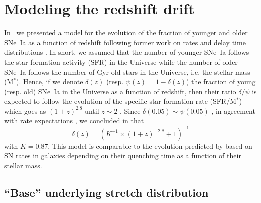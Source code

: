 \documentclass[]{aa} %
\begin{document}
\section{Modeling the redshift drift}\label{sec:modeling}

In~\cite{rigault2018} we presented a model for the evolution of the fraction of
younger and older SNe~Ia as a function of redshift following former work on
rates and delay time distributions \citep[e.g.,][]{mannucci2005,
scannapieco2005, sullivan2006, aubourg2008, childress2014, maozmannucci2014}.
In short, we assumed that the number of younger SNe~Ia follows the star
formation activity (SFR) in the Universe while the number of older SNe~Ia
follows the number of Gyr-old stars in the Universe, i.e. the stellar mass
(M$^*$). Hence, if we denote $\delta(z)$ (resp. $\psi(z) = 1-\delta(z)$) the
fraction of young (resp. old) SNe~Ia in the Universe as a function of redshift,
then their ratio $\delta/\psi$ is expected to follow the evolution of the
specific star formation rate (SFR/M$^*$) which goes as $(1+z)^{2.8}$ until
$z\sim2$ \citep[e.g.,][]{tasca2015}. Since $\delta(0.05) \sim \psi(0.05)$
\citep{rigault2013,rigault2018,wiseman2020}, in agreement with rate expectations
\citep{mannucci2006,rodney2014}, we concluded in \cite{rigault2018} that
\begin{equation}
    \label{eq:delta}
    \delta(z) = \left( K^{-1} \times (1+z)^{-2.8} +1 \right)^{-1}
\end{equation}
with $K=0.87$. This model is comparable to the evolution predicted by
\cite{childress2014} based on SN rates in galaxies depending on their quenching
time as a function of their stellar mass.

\subsection{“Base” underlying stretch distribution}
\label{sec:basemodel}
\end{document}
